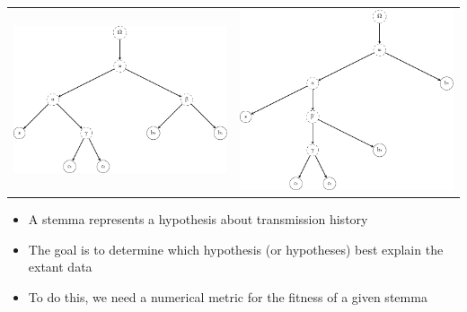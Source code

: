 \documentclass[10pt]{beamer}
\begin{document}
	\begin{frame}
		\begin{tabular}{p{} @{\hskip 0.1\textwidth} p{}}
			\vspace{0pt}\includegraphics[scale=0.4]{../img/gene-tree-rooted-site-1.pdf} & \vspace{0pt}\includegraphics[scale=0.4]{../img/gene-tree-rooted-site-2.pdf}
		\end{tabular}
		\begin{itemize}
			\item A stemma represents a hypothesis about transmission history
			\item The goal is to determine which hypothesis (or hypotheses) best explain the extant data
			\item To do this, we need a numerical metric for the fitness of a given stemma
		\end{itemize}
	\end{frame}
\end{document}
